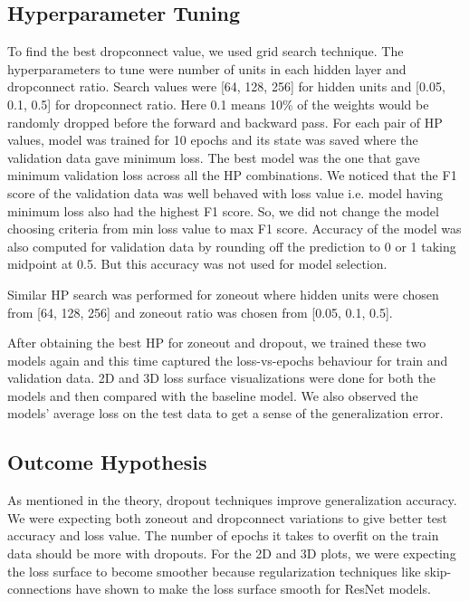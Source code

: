\documentclass{article}
\begin{document}
\subsection{Hyperparameter Tuning}

To find the best dropconnect value, we used grid search technique. The hyperparameters to tune were number of units in each hidden layer and dropconnect ratio. Search values were [64, 128, 256] for hidden units and [0.05, 0.1, 0.5] for dropconnect ratio. Here 0.1 means 10\% of the weights would be randomly dropped before the forward and backward pass. For each pair of HP values, model was trained for 10 epochs and its state was saved where the validation data gave minimum loss. The best model was the one that gave minimum validation loss across all the HP combinations. We noticed that the F1 score of the validation data was well behaved with loss value i.e. model having minimum loss also had the highest F1 score. So, we did not change the model choosing criteria from min loss value to max F1 score. Accuracy of the model was also computed for validation data by rounding off the prediction to 0 or 1 taking midpoint at 0.5. But this accuracy was not used for model selection.

Similar HP search was performed for zoneout where hidden units were chosen from [64, 128, 256] and zoneout ratio was chosen from [0.05, 0.1, 0.5].

After obtaining the best HP for zoneout and dropout, we trained these two models again and this time captured the loss-vs-epochs behaviour for train and validation data. 2D and 3D loss surface visualizations were done for both the models and then compared with the baseline model. We also observed the models' average loss on the test data to get a sense of the generalization error.

\subsection{Outcome Hypothesis}

As mentioned in the theory, dropout techniques improve generalization accuracy. We were expecting both zoneout and dropconnect variations to give better test accuracy and loss value. The number of epochs it takes to overfit on the train data should be more with dropouts. For the 2D and 3D plots, we were expecting the loss surface to become smoother because regularization techniques like skip-connections have shown to make the loss surface smooth for ResNet models.
\end{document}
